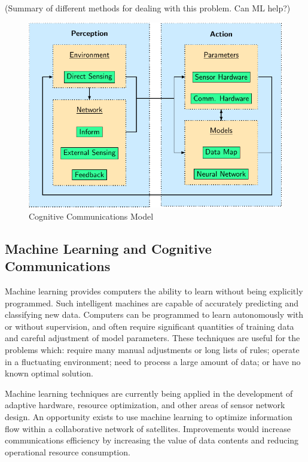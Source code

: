 \documentclass[conference]{IEEEtran}
\begin{document}
{\color{red} (Summary of different methods for dealing with this problem. Can ML
help?)}

\begin{figure}[b]
  \centerline{\includegraphics[width=0.9\linewidth]
    {images/working/flowchart.pdf}
  }
  \caption{Cognitive Communications Model}
  \label{fig:model}
\end{figure}

\subsection{Machine Learning and Cognitive Communications}
\label{ssec:ml}

Machine learning provides computers the ability to learn without being
explicitly programmed.  Such intelligent machines are capable of accurately
predicting and classifying new data.  Computers can be programmed to learn
autonomously with or without supervision, and often require significant
quantities of training data and careful adjustment of model parameters.  These
techniques are useful for the problems which: require many manual adjustments or
long lists of rules; operate in a fluctuating environment; need to process a
large amount of data; or have no known optimal solution.

Machine learning techniques are currently being applied in the development of
adaptive hardware, resource optimization, and other areas of sensor network
design.  An opportunity exists to use machine learning to optimize information
flow within a collaborative network of satellites.  Improvements would increase
communications efficiency by increasing the value of data contents and reducing
operational resource consumption.
\end{document}
